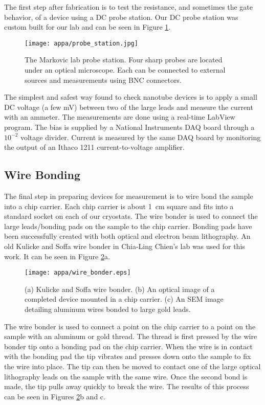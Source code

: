The first step after fabrication is to test the resistance, and sometimes the gate behavior, of a device using a DC probe station. Our DC probe station was custom built for our lab and can be seen in Figure \ref{fig:probe_station}.

\begin{figure}
	\centering
	\texttt{[image: appa/probe\_station.jpg]}
	\caption{The Markovic lab probe station. Four sharp probes are located under an optical microscope. Each can be connected to external sources and measurements using BNC connectors.}
	\label{fig:probe_station}
\end{figure}

The simplest and safest way found to check nanotube devices is to apply a small DC voltage (a few \si{\milli\volt}) between two of the large leads and measure the current with an ammeter. The measurements are done using a real-time LabView program. The bias is supplied by a National Instruments DAQ board through a $10^{-2}$ voltage divider. Current is measured by the same DAQ board by monitoring the output of an Ithaco 1211 current-to-voltage amplifier. 

\subsection{Wire Bonding}
\label{subsec:wire_bonding}

The final step in preparing devices for measurement is to wire bond the sample into a chip carrier. Each chip carrier is about \SI{1}{\centi\meter} square and fits into a standard socket on each of our cryostats. The wire bonder is used to connect the large leads/bonding pads on the sample to the chip carrier. Bonding pads have been successfully created with both optical and electron beam lithography. An old Kulicke and Soffa wire bonder in Chia-Ling Chien's lab was used for this work. It can be seen in Figure \ref{fig:wire_bonder}a.

\begin{figure}
	\centering
	\texttt{[image: appa/wire\_bonder.eps]}
	\caption{(a) Kulicke and Soffa wire bonder. (b) An optical image of a completed device mounted in a chip carrier. (c) An SEM image detailing aluminum wires bonded to large gold leads.}
	\label{fig:wire_bonder}
\end{figure}

The wire bonder is used to connect a point on the chip carrier to a point on the sample with an aluminum or gold thread. The thread is first pressed by the wire bonder tip onto a bonding pad on the chip carrier. When the wire is in contact with the bonding pad the tip vibrates and presses down onto the sample to fix the wire into place. The tip can then be moved to contact one of the large optical lithography leads on the sample with the same wire. Once the second bond is made, the tip pulls away quickly to break the wire. The results of this process can be seen in Figures \ref{fig:wire_bonder}b and c.
